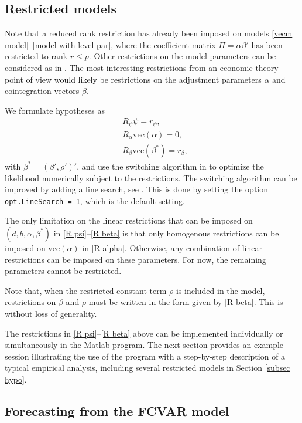\documentclass[10pt]{article}
\begin{document}
\subsection{Restricted models}
\label{restricted models}

Note that a reduced rank restriction has already been imposed on models \eqref{vecm model}--\eqref{model with level par}, where the coefficient matrix $\Pi  = \alpha \beta '$ has been restricted to rank $r \leq p$. Other restrictions on the model parameters can be considered as in \cite{Johansen1995}. The most interesting restrictions from an economic theory point of view would likely be restrictions on the adjustment parameters $\alpha$ and cointegration vectors $\beta$.

We formulate hypotheses as
\begin{align}
  &R_{\psi} \psi = r_{\psi}, \label{R psi} \\
  &R_\alpha \mathrm{vec}(\alpha) = 0, \label{R alpha} \\
  &R_\beta \mathrm{vec}(\beta^{\ast}) = r_\beta, \label{R beta}
\end{align}
with $\beta^{\ast} = (\beta', \rho')'$, and use the switching algorithm in \cite[p.\ 455]{Boswijk2004} to optimize the likelihood numerically subject to the restrictions. The switching algorithm can be improved by adding a line search, see \cite{Doornik2016}. This is done by setting the option \verb|opt.LineSearch = 1|, which is the default setting.

The only limitation on the linear restrictions that can be imposed on $(d,b,\alpha,\beta^{\ast})$ in \eqref{R psi}--\eqref{R beta} is that only homogenous restrictions can be imposed on $\mathrm{vec}(\alpha)$ in \eqref{R alpha}. Otherwise, any combination of linear restrictions can be imposed on these parameters. For now, the remaining parameters cannot be restricted.

Note that, when the restricted constant term $\rho$ is included in the model, restrictions on $\beta$ and $\rho$ must be written in the form given by \eqref{R beta}. This is without loss of generality.

The restrictions in \eqref{R psi}--\eqref{R beta} above can be implemented individually or simultaneously in the Matlab program. The next section provides an example session illustrating the use of the program with a step-by-step description of a typical empirical analysis, including several restricted models in Section \ref{subsec hypo}.


\subsection{Forecasting from the FCVAR model}
\end{document}
